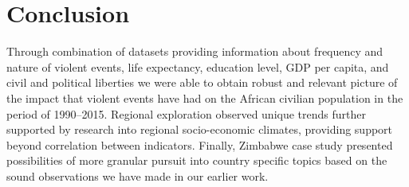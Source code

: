 \documentclass[a4paper,11pt]{article}
\begin{document}
\section{Conclusion}

Through combination of datasets providing information about frequency and nature of violent events, life expectancy, education level, GDP per capita, and civil and political liberties we were able to obtain robust and relevant picture of the impact that violent events have had on the African civilian population in the period of 1990--2015. Regional exploration observed unique trends further supported by research into regional socio-economic climates, providing support beyond correlation between indicators. Finally, Zimbabwe case study presented possibilities of more granular pursuit into country specific topics based on the sound observations we have made in our earlier work.


\end{document}
